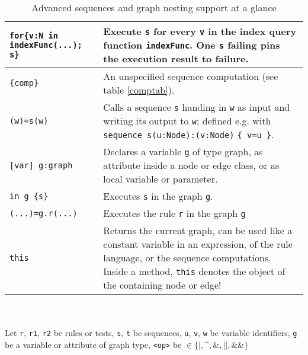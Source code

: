 \begin{table}[htbp]
\begin{minipage}{\linewidth}
\begin{tabularx}{\linewidth}{|lX|}
\texttt{for\{v:N in indexFunc(...); s\}} & Execute \texttt{s} for every \texttt{v} in the index query function \texttt{indexFunc}. One \texttt{s} failing pins the execution result to failure.\\
\hline
\texttt{\{comp\}}	& An unspecified sequence computation (see table \ref{comptab}).\\
\hline
\texttt{(w)=s(w)} & Calls a sequence \texttt{s} handing in \texttt{w} as input and writing its output to \texttt{w}; defined e.g. with \texttt{sequence s(u:Node):(v:Node)} \texttt{\{ v=u \}}.\\
\hline
\hline
\texttt{[var] g:graph}	& Declares a variable \texttt{g} of type graph, as attribute inside a node or edge class, or as local variable or parameter.\\
\hline
\texttt{in g \{s\}}	& Executes \texttt{s} in the graph \texttt{g}.\\
\hline
\texttt{(...)=g.r(...)} & Executes the rule \texttt{r} in the graph \texttt{g}\\
\hline
\texttt{this} & Returns the current graph, can be used like a constant variable in an expression, of the rule language, or the sequence computations. Inside a method, \texttt{this} denotes the object of the containing node or edge!\\
\hline
\end{tabularx}\indexmain{\texttt{<>}}\indexmain{\texttt{<<;>>}}
\end{minipage}\\
\\ 
{\small Let \texttt{r}, \texttt{r1}, \texttt{r2} be rules or tests, \texttt{s}, \texttt{t} be sequences, \texttt{u}, \texttt{v}, \texttt{w} be variable identifiers, \texttt{g} be a variable or attribute of graph type, \texttt{<op>} be $\in \{\texttt{|}, \texttt{\textasciicircum}, \texttt{\&}, \texttt{||}, \texttt{\&\&}\}$ }%
\caption{Advanced sequences and graph nesting support at a glance}
\label{seqtab}
\end{table}
 
